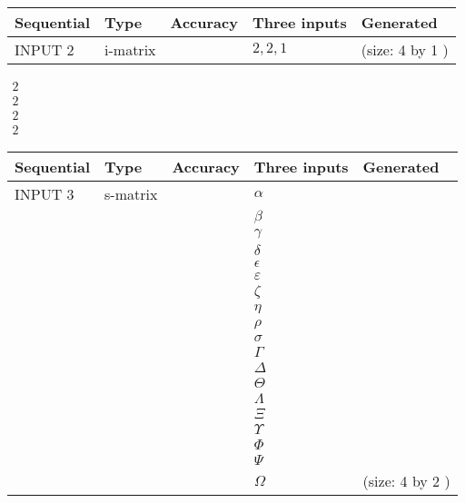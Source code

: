 \documentclass[12pt]{article}
\begin{document}
  
\noindent\begin{tabular}{|l|l|l|l|l|}
\hline
 Sequential & Type & Accuracy & Three inputs & Generated \\ 
\hline
 
 
  INPUT $            2 $ & i-matrix &  & $
 2
 , 
 2
 , 
 1
 $ & (size:            4  by            1 )
 \\  \hline  
 \end{tabular}
   
   
 $\begin{array}{
 c
 }
           2  \\ 
           2  \\ 
           2  \\ 
           2
\end{array}  $ 
  
  
\noindent\begin{tabular}{|l|l|l|l|l|}
\hline
 Sequential & Type & Accuracy & Three inputs & Generated \\ 
\hline
 
 
  INPUT $            3 $ & s-matrix & & 
 $  \alpha $ & 
  \\
  & & & 
 $  \beta $ & 
  \\
  & & & 
 $  \gamma $ & 
  \\
  & & & 
 $  \delta $ & 
  \\
  & & & 
 $  \epsilon $ & 
  \\
  & & & 
 $  \varepsilon $ & 
  \\
  & & & 
 $                     \zeta $ & 
  \\
  & & & 
 $  \eta $ & 
  \\
  & & & 
 $  \rho $ & 
  \\
  & & & 
 $  \sigma $ & 
  \\
  & & & 
 $  \Gamma $ & 
  \\
  & & & 
 $  \Delta $ & 
  \\
  & & & 
 $  \Theta $ & 
  \\
  & & & 
 $  \Lambda $ & 
  \\
  & & & 
 $                     \Xi $ & 
  \\
  & & & 
 $  \Upsilon $ & 
  \\
  & & & 
 $  \Phi $ & 
  \\
  & & & 
 $  \Psi $ & 
  \\
  & & & 
 $  \Omega $ & 
  (size:            4  by            2 )
 \\  \hline  
 \end{tabular}
   
\end{document}
